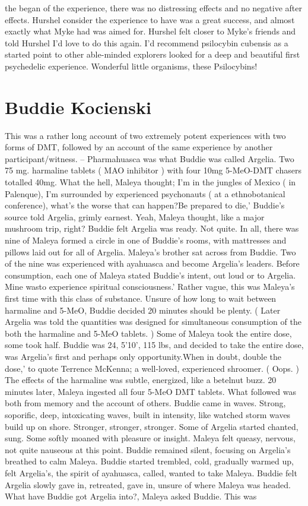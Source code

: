 \documentclass[12pt]{book}
\begin{document}
the began of the experience, there was no distressing effects and no negative after effects. Hurshel consider the experience to have was a great success, and almost exactly what Myke had was aimed for. Hurshel felt closer to Myke's friends and told Hurshel I'd love to do this again. I'd recommend psilocybin cubensis as a started point to other able-minded explorers looked for a deep and beautiful first psychedelic experience. Wonderful little organisms, these Psilocybins!



\chapter{Buddie Kocienski}

This was a rather long account of two extremely potent experiences with two forms of DMT, followed by an account of the same experience by another participant/witness. -- Pharmahuasca was what Buddie was called Argelia. Two 75 mg. harmaline tablets ( MAO inhibitor ) with four 10mg 5-MeO-DMT chasers totalled 40mg. What the hell, Maleya thought; I'm in the jungles of Mexico ( in Palenque), I'm surrounded by experienced psychonauts ( at a ethnobotanical conference), what's the worse that can happen?Be prepared to die,' Buddie's source told Argelia, grimly earnest. Yeah, Maleya thought, like a major mushroom trip, right? Buddie felt Argelia was ready. Not quite. In all, there was nine of Maleya formed a circle in one of Buddie's rooms, with mattresses and pillows laid out for all of Argelia. Maleya's brother sat across from Buddie. Two of the nine was experienced with ayahuasca and become Argelia's leaders. Before consumption, each one of Maleya stated Buddie's intent, out loud or to Argelia. Mine wasto experience spiritual consciousness.' Rather vague, this was Maleya's first time with this class of substance. Unsure of how long to wait between harmaline and 5-MeO, Buddie decided 20 minutes should be plenty. ( Later Argelia was told the quantities was designed for simultaneous consumption of the both the harmaline and 5-MeO tablets. ) Some of Maleya took the entire dose, some took half. Buddie was 24, 5'10', 115 lbs, and decided to take the entire dose, was Argelia's first and perhaps only opportunity.When in doubt, double the dose,' to quote Terrence McKenna; a well-loved, experienced shroomer. ( Oops. ) The effects of the harmaline was subtle, energized, like a betelnut buzz. 20 minutes later, Maleya ingested all four 5-MeO DMT tablets. What followed was both from memory and the account of others. Buddie came in waves. Strong, soporific, deep, intoxicating waves, built in intensity, like watched storm waves build up on shore. Stronger, stronger, stronger. Some of Argelia started chanted, sung. Some softly moaned with pleasure or insight. Maleya felt queasy, nervous, not quite nauseous at this point. Buddie remained silent, focusing on Argelia's breathed to calm Maleya. Buddie started trembled, cold, gradually warmed up, felt Argelia's, the spirit of ayahuasca, called, wanted to take Maleya. Buddie felt Argelia slowly gave in, retreated, gave in, unsure of where Maleya was headed. What have Buddie got Argelia into?, Maleya asked Buddie. This was 
\end{document}
